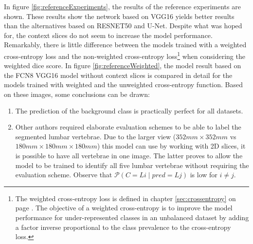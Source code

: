 \par{
    In figure \ref{fig:referenceExperiments}, the results of the reference experiments are shown.
    These results show the network based on VGG16 yields better results than the alternatives based on RESNET50 and U-Net.
    Despite what was hoped for, the context slices do not seem to increase the model performance.
    Remarkably, there is little difference between the models trained with a weighted cross-entropy loss and the non-weighted cross-entropy loss\footnote{
        The weighted cross-entropy loss is defined in chapter \ref{sec:crossentropy} on page \pageref{sec:crossentropy}. 
        The objective of a weighted cross-entropy is to improve the model performance for under-represented classes in an unbalanced dataset by adding a factor inverse proportional to the class prevalence to the cross-entropy loss.
    } when considering the weighted dice score.
    In figure \ref{fig:referenceWeighted}, the model result based on the FCN8 VGG16 model without context slices is compared in detail for the models trained with weighted and the unweighted cross-entropy function.
    Based on these images, some conclusions can be drawn:
    \begin{enumerate}
        \item The prediction of the background class is practically perfect for all datasets.
        \item Other authors \cite{Lessmann2018,Chuang2019} required elaborate evaluation schemes to be able to label the segmented lumbar vertebrae. 
        Due to the larger view ($352 mm \times 352 mm$ vs $180 mm \times 180 mm \times 180 mm$) this model can use by working with 2D slices, it is possible to have all vertebrae in one image.
        The latter proves to allow the model to be trained to identify all five lumbar vertebrae without requiring the evaluation scheme.
        Observe that $\mathcal{P}(C = Li \mid pred = Lj)$ is low for $i\neq j$.
    \end{enumerate}
}

